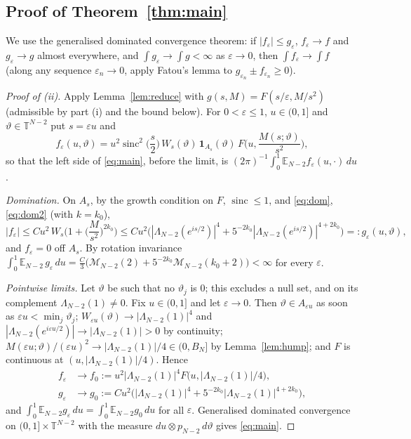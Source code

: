 \documentclass[12pt]{amsart}
\theoremstyle{remark}
\newcommand{\E}{\mathbb{E}}
\newcommand{\eps}{\varepsilon}
\newcommand{\T}{\mathbb{T}}
\newcommand{\1}{\mathbf{1}}
\newcommand{\sinc}{\operatorname{sinc}}
\begin{document}
\subsection{Proof of Theorem~\ref{thm:main}}
We use the generalised dominated convergence theorem: if $|f_\eps|\le
g_\eps$, $f_\eps\to f$ and $g_\eps\to g$ almost everywhere, and $\int
g_\eps\to\int g<\infty$ as $\eps\to0$, then $\int f_\eps\to\int f$ (along
any sequence $\eps_n\to0$, apply Fatou's lemma to $g_{\eps_n}\pm
f_{\eps_n}\ge0$).

\begin{proof}[Proof of (ii)]
Apply Lemma~\ref{lem:reduce} with $g(s,M)=F(s/\eps,M/s^2)$ (admissible by
part (i) and the bound below). For $0<\eps\le1$, $u\in(0,1]$ and
$\vartheta\in\T^{N-2}$ put $s=\eps u$ and
\[
f_\eps(u,\vartheta)=u^2\sinc^2\Big(\frac{s}2\Big)\,W_s(\vartheta)\,
\1_{A_s}(\vartheta)\,F\Big(u,\frac{M(s;\vartheta)}{s^2}\Big),
\]
so that the left side of \eqref{eq:main}, before the limit, is
$(2\pi)^{-1}\int_0^1\E_{N-2}f_\eps(u,\cdot)\,du$.

\emph{Domination.} On $A_s$, by the growth condition on $F$, $\sinc\le1$,
and \eqref{eq:dom}, \eqref{eq:dom2} (with $k=k_0$),
\[
|f_\eps|\le C u^2\,W_s\Big(1+\Big(\frac{M}{s^2}\Big)^{2k_0}\Big)
\le C u^2\Big(|\Lambda_{N-2}(e^{is/2})|^4+5^{-2k_0}
|\Lambda_{N-2}(e^{is/2})|^{4+2k_0}\Big)=:g_\eps(u,\vartheta),
\]
and $f_\eps=0$ off $A_s$. By rotation invariance
$\int_0^1\E_{N-2}\,g_\eps\,du=\frac C3\big(\mathcal M_{N-2}(2)+5^{-2k_0}
\mathcal M_{N-2}(k_0+2)\big)<\infty$ for every $\eps$.

\emph{Pointwise limits.} Let $\vartheta$ be such that no $\vartheta_j$ is
$0$; this excludes a null set, and on its complement
$\Lambda_{N-2}(1)\ne0$. Fix $u\in(0,1]$ and let $\eps\to0$. Then
$\vartheta\in A_{\eps u}$ as soon as $\eps u<\min_j\vartheta_j$;
$W_{\eps u}(\vartheta)\to|\Lambda_{N-2}(1)|^4$ and
$|\Lambda_{N-2}(e^{i\eps u/2})|\to|\Lambda_{N-2}(1)|>0$ by continuity;
$M(\eps u;\vartheta)/(\eps u)^2\to|\Lambda_{N-2}(1)|/4\in(0,B_N]$ by
Lemma~\ref{lem:hump}; and $F$ is continuous at
$(u,|\Lambda_{N-2}(1)|/4)$. Hence
\begin{align*}
f_\eps&\to f_0:=u^2|\Lambda_{N-2}(1)|^4F\big(u,|\Lambda_{N-2}(1)|/4\big),\\
g_\eps&\to g_0:=Cu^2\big(|\Lambda_{N-2}(1)|^4+5^{-2k_0}|\Lambda_{N-2}(1)|^{4+2k_0}\big),
\end{align*}
and $\int_0^1\E_{N-2}g_\eps\,du=\int_0^1\E_{N-2}g_0\,du$ for all $\eps$.
Generalised dominated convergence on $(0,1]\times\T^{N-2}$ with the measure
$du\otimes p_{N-2}\,d\vartheta$ gives \eqref{eq:main}.
\end{proof}
\end{document}
